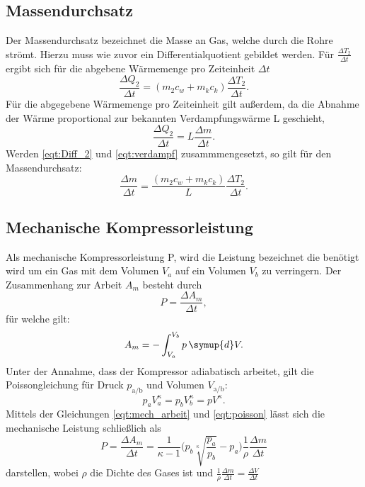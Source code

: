   \subsection{Massendurchsatz}
    Der Massendurchsatz bezeichnet die Masse an Gas, welche durch die Rohre strömt.
    Hierzu muss wie zuvor ein Differentialquotient gebildet werden. Für $\frac {\Delta T_2}{\Delta t}$ ergibt sich für die abgebene Wärmemenge pro Zeiteinheit $\Delta t$
    \begin{equation}
      \label{eqt:Diff_2}
      \frac {\Delta Q_2} {\Delta t} = (m_2 c_w + m_k c_k) \frac {\Delta T_2} {\Delta t}.
    \end{equation}
    Für die abgegebene Wärmemenge pro Zeiteinheit gilt außerdem, da die Abnahme der Wärme proportional zur bekannten Verdampfungswärme L geschieht, 
    \begin{equation}
      \label{eqt:verdampf}
      \frac {\Delta Q_2}{\Delta t} = L \frac {\Delta m} {\Delta t} .
    \end{equation}
    Werden \eqref {eqt:Diff_2} und \eqref {eqt:verdampf} zusammmengesetzt, so gilt für den Massendurchsatz:
    \begin{equation}
      \label{eqt:massendurchsatz}
      \frac {\Delta m} {\Delta t} = \frac {(m_2 c_w + m_k c_k)}{L} \frac {\Delta T_2} {\Delta t} .
    \end{equation}

  \subsection{Mechanische Kompressorleistung}
    Als mechanische Kompressorleistung P, wird die Leistung bezeichnet die benötigt wird um ein Gas mit dem Volumen $V_a$ auf ein Volumen $V_b$ zu verringern.
    Der Zusammenhang zur Arbeit $A_m$ besteht durch
    \begin{equation}
      P = \frac {\Delta A_m} {\Delta t},
    \end{equation}
    für welche gilt:
    \begin{equation}
      \label{eqt:mech_arbeit}
      A_m = - \int_{V_a}^{V_b} p \, \symup{d}V .
    \end{equation}
    Unter der Annahme, dass der Kompressor adiabatisch arbeitet, gilt die Poissongleichung für Druck $p_\text{a/b}$ und Volumen $V_\text{a/b}$:
    \begin{equation}
      \label{eqt:poisson}
      p_a V_a^\kappa = p_b V_b^\kappa = p V^\kappa .
    \end{equation}
    Mittels der Gleichungen \eqref {eqt:mech_arbeit} und \eqref {eqt:poisson} lässt sich die mechanische Leistung schließlich als
    \begin{equation}
      \label{eqt:mech_leistung}
      P = \frac {\Delta A_m} {\Delta t} = \frac {1}{\kappa -1} \bigg(p_b \sqrt[\kappa]{\frac{p_a}{p_b}} - p_a\bigg) \frac {1}{\rho} \frac {\Delta m} {\Delta t}  
    \end{equation}  
    darstellen, wobei $\rho$ die Dichte des Gases ist und $\frac {1}{\rho} \frac {\Delta m} {\Delta t} = \frac {\Delta V}{\Delta t}$